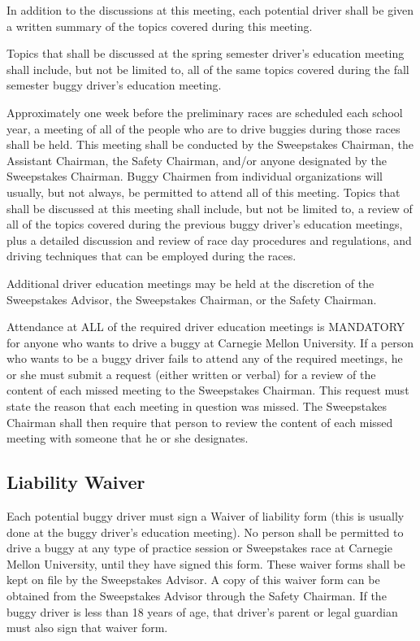 	In addition to the discussions at this meeting, each potential driver shall be
	given a written summary of the topics covered during this meeting.

	Topics that shall be discussed at the spring semester driver's education
	meeting shall include, but not be limited to, all of the same topics covered
	during the fall semester buggy driver's education meeting.

	Approximately one week before the preliminary races are scheduled each school
	year, a meeting of all of the people who are to drive buggies during those
	races shall be held. This meeting shall be conducted by the Sweepstakes
	Chairman, the Assistant Chairman, the Safety Chairman, and/or anyone designated
	by the Sweepstakes Chairman. Buggy Chairmen from individual organizations will
	usually, but not always, be permitted to attend all of this meeting. Topics
	that shall be discussed at this meeting shall include, but not be limited to, a
	review of all of the topics covered during the previous buggy driver's
	education meetings, plus a detailed discussion and review of race day
	procedures and regulations, and driving techniques that can be employed during
	the races.

	Additional driver education meetings may be held at the discretion of the
	Sweepstakes Advisor, the Sweepstakes Chairman, or the Safety Chairman.

	Attendance at ALL of the required driver education meetings is MANDATORY for
	anyone who wants to drive a buggy at Carnegie Mellon University. If a person
	who wants to be a buggy driver fails to attend any of the required meetings, he
	or she must submit a request (either written or verbal) for a review of the
	content of each missed meeting to the Sweepstakes Chairman. This request must
	state the reason that each meeting in question was missed. The Sweepstakes
	Chairman shall then require that person to review the content of each missed
	meeting with someone that he or she designates.

\subsection{Liability Waiver}

	Each potential buggy driver must sign a Waiver of liability form (this is
	usually done at the buggy driver's education meeting). No person shall be
	permitted to drive a buggy at any type of practice session or Sweepstakes race
	at Carnegie Mellon University, until they have signed this form. These waiver
	forms shall be kept on file by the Sweepstakes Advisor. A copy of this waiver
	form can be obtained from the Sweepstakes Advisor through the Safety Chairman.
	If the buggy driver is less than 18 years of age, that driver's parent or legal
	guardian must also sign that waiver form.

